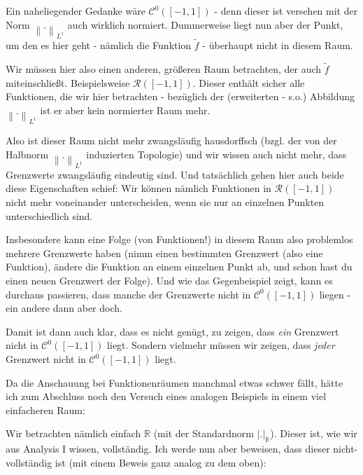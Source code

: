 \documentclass[a4paper,ngerman,12pt,bibtotoc]{scrartcl}
\theoremstyle{definition}
\theoremstyle{plain}
\theoremstyle{remark}
\newcommand{\RR}{\mathbb{R}}
\newcommand{\lInorm}[1]{\left\lVert #1 \right\rVert_{L^1}}
\begin{document}
\begin{enumerate}
		Ein naheliegender Gedanke wäre $\mathcal{C}^0\left(\left[-1,1\right]\right)$ - denn dieser ist versehen mit der Norm $\lInorm{.}$ auch wirklich normiert. Dummerweise liegt nun aber der Punkt, um den es hier geht - nämlich die Funktion $\tilde{f}$ - überhaupt nicht in diesem Raum.
		
		Wir müssen hier also einen anderen, größeren Raum betrachten, der auch $\tilde{f}$ miteinschließt. Beispielsweise $\mathcal{R}\left(\left[-1,1\right]\right)$. Dieser enthält sicher alle Funktionen, die wir hier betrachten - bezüglich der (erweiterten - s.o.) Abbildung $\lInorm{.}$ ist er aber kein normierter Raum mehr.
		
		Also ist dieser Raum nicht mehr zwangsläufig hausdorffsch (bzgl. der von der Halbnorm $\lInorm{.}$ induzierten Topologie) und wir wissen auch nicht mehr, dass Grenzwerte zwangsläufig eindeutig sind. Und tatsächlich gehen hier auch beide diese Eigenschaften schief: Wir können nämlich Funktionen in $\mathcal{R}\left(\left[-1,1\right]\right)$ nicht mehr voneinander unterscheiden, wenn sie nur an einzelnen Punkten unterschiedlich sind.
		
		Insbesondere kann eine Folge (von Funktionen!) in diesem Raum also problemlos mehrere Grenzwerte haben (nimm einen bestimmten Grenzwert (also eine Funktion), ändere die Funktion an einem einzelnen Punkt ab, und schon hast du einen neuen Grenzwert der Folge). Und wie das Gegenbeispiel zeigt, kann es durchaus passieren, dass manche der Grenzwerte nicht in $\mathcal{C}^0\left(\left[-1,1\right]\right)$ liegen - ein andere dann aber doch.
		
		Damit ist dann auch klar, dass es nicht genügt, zu zeigen, dass \emph{ein} Grenzwert nicht in $\mathcal{C}^0\left(\left[-1,1\right]\right)$ liegt. Sondern vielmehr müssen wir zeigen, dass \emph{jeder} Grenzwert nicht in $\mathcal{C}^0\left(\left[-1,1\right]\right)$ liegt.
	\end{enumerate}
	
	\hrulefill
	
	Da die Anschauung bei Funktionenräumen manchmal etwas schwer fällt, hätte ich zum Abschluss noch den Versuch eines analogen Beispiels in einem viel einfacheren Raum:
		
	Wir betrachten nämlich einfach $\RR$ (mit der Standardnorm $\vert.\vert_\RR$). Dieser ist, wie wir aus Analysis I wissen, vollständig. Ich werde nun aber beweisen, dass dieser nicht-vollständig ist (mit einem \glqq Beweis\grqq{} ganz analog zu dem oben):
	
\end{document}
